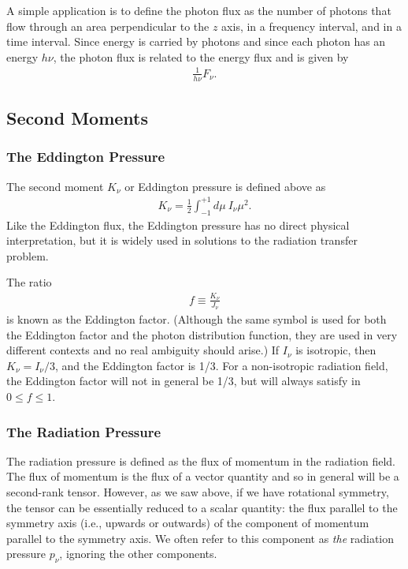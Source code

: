 A simple application is to define the photon flux as the number of photons that flow through an area perpendicular to the $z$ axis, in a frequency interval, and in
a time interval.
Since energy is carried by photons and since each photon has an energy
$h\nu$, the photon flux is related to the energy flux and
is given by
\begin{align}
\frac{1}{h\nu} F_\nu. 
\end{align}

\newslide

\subsection{Second Moments}

\newslide

\subsubsection{The Eddington Pressure}

The second moment $K_\nu$ or Eddington pressure is defined above as
\begin{align}
K_\nu = \frac{1}{2} \int_{-1}^{+1}\!\!\!d\mu\:I_\nu\mu^2.
\end{align}
Like the Eddington flux,
the Eddington pressure has no direct physical
interpretation, but it is widely used in solutions to the
radiation transfer problem. 

The ratio
\begin{align}
f \equiv \frac{K_\nu}{J_\nu}
\end{align}
is known as the Eddington factor. (Although the same symbol is used for
both the Eddington factor and the photon distribution function, they are
used in very different contexts and no real ambiguity should arise.) If
$I_\nu$ is isotropic, then $K_\nu = I_\nu / 3$, and the Eddington factor
is 1/3. For a non-isotropic radiation field, the Eddington factor will
not in general be 1/3, but will always satisfy in $0
\le f \le 1$.

\newslide

\subsubsection{The Radiation Pressure}

The radiation pressure is defined as the flux of momentum in the
radiation field. The flux of momentum is the flux of a vector quantity
and so in general will be a second-rank tensor. However, as we saw
above, if we have rotational symmetry, the tensor can be essentially
reduced to a scalar quantity: the flux parallel to the symmetry axis
(i.e., upwards or outwards) of the component of momentum parallel to the
symmetry axis. We often refer to this component as \emph{the} radiation pressure $p_\nu$, ignoring the other components.
 
